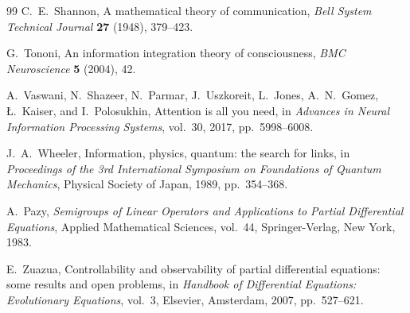 \documentclass[12pt, oneside]{memoir}
\begin{document}
\begin{thebibliography}{99}
C.~E.~Shannon,
A mathematical theory of communication,
\textit{Bell System Technical Journal} \textbf{27} (1948), 379--423.

G.~Tononi,
An information integration theory of consciousness,
\textit{BMC Neuroscience} \textbf{5} (2004), 42.

A.~Vaswani, N.~Shazeer, N.~Parmar, J.~Uszkoreit, L.~Jones, A.~N.~Gomez,
Ł.~Kaiser, and I.~Polosukhin,
Attention is all you need,
in \textit{Advances in Neural Information Processing Systems}, vol.~30, 2017,
pp.~5998--6008.

J.~A.~Wheeler,
Information, physics, quantum: the search for links,
in \textit{Proceedings of the 3rd International Symposium on Foundations of Quantum
Mechanics}, Physical Society of Japan, 1989, pp.~354--368.

A.~Pazy,
\textit{Semigroups of Linear Operators and Applications to Partial Differential Equations},
Applied Mathematical Sciences, vol.~44,
Springer-Verlag, New York, 1983.

E.~Zuazua,
Controllability and observability of partial differential equations: some results and
open problems,
in \textit{Handbook of Differential Equations: Evolutionary Equations}, vol.~3,
Elsevier, Amsterdam, 2007, pp.~527--621.

\end{thebibliography}
\end{document}
